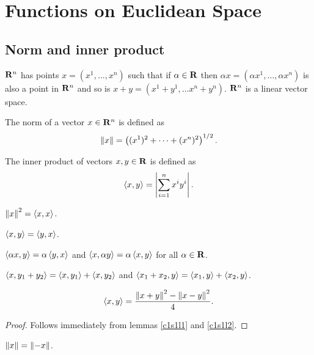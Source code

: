 \chapter{Functions on Euclidean Space}\label{c1}
\section{Norm and inner product}\label{c1s1}
$\mathbf{R}^n$ has points $x = (x^1, \ldots, x^n)$ such that if $\alpha \in \mathbf{R}$
then $\alpha x = (\alpha x^1, \ldots, \alpha x^n)$ is also a point in $\mathbf{R}^n$
and so is $x + y = (x^1 + y^1, \ldots x^n + y^n)$. $\mathbf{R}^n$ is a linear vector
space. 
\begin{defn}\label{c1s1d1}
The norm of a vector $x \in \mathbf{R}^n$ is defined as
\[
\left\Vert{x}\right\Vert = \left((x^1)^2 + \cdots + (x^n)^2\right)^{1/2}.
\]
\end{defn}

\begin{defn}\label{c1s1d2}
The inner product of vectors $x, y \in \mathbf{R}$ is defined as
\[
\left\langle{x, y}\right\rangle = \left\vert{\sum_{i=1}^n x^i y^i }\right\vert.
\]
\end{defn}

\begin{lem}\label{c1s1l1}
$\left\Vert{x}\right\Vert^2 = \left\langle{x, x}\right\rangle$.
\end{lem}

\begin{lem}\label{c1s1l2}
$\left\langle{x, y}\right\rangle = \left\langle{y, x}\right\rangle$.
\end{lem}

\begin{lem}\label{c1s1l3}
$\left\langle{\alpha x, y}\right\rangle = \alpha\left\langle{y, x}\right\rangle$ and $\left\langle{x, \alpha y}\right\rangle = \alpha\left\langle{x, y}\right\rangle$
for all $\alpha \in \mathbf{R}$.
\end{lem}

\begin{lem}\label{c1s1l4}
$\left\langle{x, y_1 + y_2}\right\rangle = \left\langle{x, y_1}\right\rangle + \left\langle{x, y_2}\right\rangle$ and $\left\langle{x_1 + x_2, y}\right\rangle = 
\left\langle{x_1, y}\right\rangle + \left\langle{x_2, y}\right\rangle$.
\end{lem}

\begin{lem}\label{c1s1l5}
\[
\left\langle{x, y}\right\rangle = \frac{\left\Vert{x + y}\right\Vert^2 - \left\Vert{x - y}\right\Vert^2}{4}.
\]
\end{lem}
\begin{proof}
Follows immediately from lemmas \ref{c1s1l1} and \ref{c1s1l2}.
\end{proof}

\begin{lem}\label{c1s1l6}
$\left\Vert{x}\right\Vert = \left\Vert{-x}\right\Vert$.
\end{lem}

